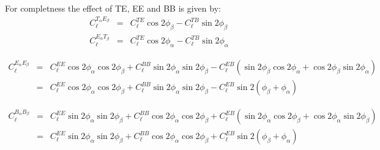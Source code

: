 \documentclass[a4paper, 11pt]{article}
\def\ba{\begin{eqnarray}}
\def\ea{\end{eqnarray}}
\begin{document}
For completness the effect of TE, EE and BB is given by:
\ba
C^{T_{\alpha} E_{\beta}}_{\ell} &=& C^{TE}_{\ell}  \cos 2\phi_{\beta} - C^{TB}_{\ell}   \sin 2\phi_{\beta} \\
C^{E_{\alpha} T_{\beta}}_{\ell} &=& C^{TE}_{\ell}  \cos 2\phi_{\alpha} - C^{TB}_{\ell}   \sin 2\phi_{\alpha}
\ea


\ba
C^{E_{\alpha} E_{\beta}}_{\ell} &=&  C^{EE}_{\ell} \cos 2\phi_{\alpha} \cos 2\phi_{\beta} + C^{BB}_{\ell} \sin 2\phi_{\alpha} \sin 2\phi_{\beta} - C^{EB}_{\ell} ( \sin 2\phi_{\beta}  \cos 2\phi_{\alpha} +\cos 2\phi_{\beta} \sin 2\phi_{\alpha} ) \nonumber \\
&=& C^{EE}_{\ell} \cos 2\phi_{\alpha} \cos 2\phi_{\beta} + C^{BB}_{\ell} \sin 2\phi_{\alpha} \sin 2\phi_{\beta} - C^{EB}_{\ell}  \sin 2(\phi_{\beta} + \phi_{\alpha} ) 
\ea


\ba
C^{B_{\alpha} B_{\beta}}_{\ell} &=&  C^{EE}_{\ell} \sin 2\phi_{\alpha} \sin 2\phi_{\beta} + C^{BB}_{\ell} \cos 2\phi_{\alpha} \cos 2\phi_{\beta} + C^{EB}_{\ell}(\sin 2\phi_{\alpha} \cos 2\phi_{\beta} + \cos 2\phi_{\alpha} \sin 2\phi_{\beta} ) \nonumber \\
&=&  C^{EE}_{\ell} \sin 2\phi_{\alpha} \sin 2\phi_{\beta} + C^{BB}_{\ell} \cos 2\phi_{\alpha} \cos 2\phi_{\beta} + C^{EB}_{\ell}  \sin 2(\phi_{\beta} + \phi_{\alpha} ) 
\ea
\end{document}
